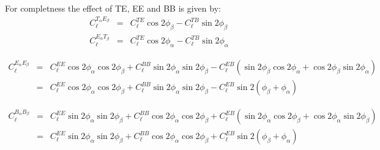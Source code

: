 \documentclass[a4paper, 11pt]{article}
\def\ba{\begin{eqnarray}}
\def\ea{\end{eqnarray}}
\begin{document}
For completness the effect of TE, EE and BB is given by:
\ba
C^{T_{\alpha} E_{\beta}}_{\ell} &=& C^{TE}_{\ell}  \cos 2\phi_{\beta} - C^{TB}_{\ell}   \sin 2\phi_{\beta} \\
C^{E_{\alpha} T_{\beta}}_{\ell} &=& C^{TE}_{\ell}  \cos 2\phi_{\alpha} - C^{TB}_{\ell}   \sin 2\phi_{\alpha}
\ea


\ba
C^{E_{\alpha} E_{\beta}}_{\ell} &=&  C^{EE}_{\ell} \cos 2\phi_{\alpha} \cos 2\phi_{\beta} + C^{BB}_{\ell} \sin 2\phi_{\alpha} \sin 2\phi_{\beta} - C^{EB}_{\ell} ( \sin 2\phi_{\beta}  \cos 2\phi_{\alpha} +\cos 2\phi_{\beta} \sin 2\phi_{\alpha} ) \nonumber \\
&=& C^{EE}_{\ell} \cos 2\phi_{\alpha} \cos 2\phi_{\beta} + C^{BB}_{\ell} \sin 2\phi_{\alpha} \sin 2\phi_{\beta} - C^{EB}_{\ell}  \sin 2(\phi_{\beta} + \phi_{\alpha} ) 
\ea


\ba
C^{B_{\alpha} B_{\beta}}_{\ell} &=&  C^{EE}_{\ell} \sin 2\phi_{\alpha} \sin 2\phi_{\beta} + C^{BB}_{\ell} \cos 2\phi_{\alpha} \cos 2\phi_{\beta} + C^{EB}_{\ell}(\sin 2\phi_{\alpha} \cos 2\phi_{\beta} + \cos 2\phi_{\alpha} \sin 2\phi_{\beta} ) \nonumber \\
&=&  C^{EE}_{\ell} \sin 2\phi_{\alpha} \sin 2\phi_{\beta} + C^{BB}_{\ell} \cos 2\phi_{\alpha} \cos 2\phi_{\beta} + C^{EB}_{\ell}  \sin 2(\phi_{\beta} + \phi_{\alpha} ) 
\ea
\end{document}
